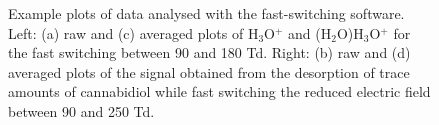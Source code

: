 \begin{figure}[t]
\centering
{}

\caption[Example plots of data analysed with the fast-switching software]{Example plots of data analysed with the fast-switching software. Left: (a) raw and (c) averaged plots of H$_3$O$^+$ and (H$_2$O)H$_3$O$^+$ for the fast switching between 90 and 180 Td. Right: (b) raw and (d) averaged plots of the signal obtained from the desorption of trace amounts of cannabidiol while fast switching the reduced electric field between 90 and 250 Td.}
\label{fig:fss_plots}
\end{figure}


